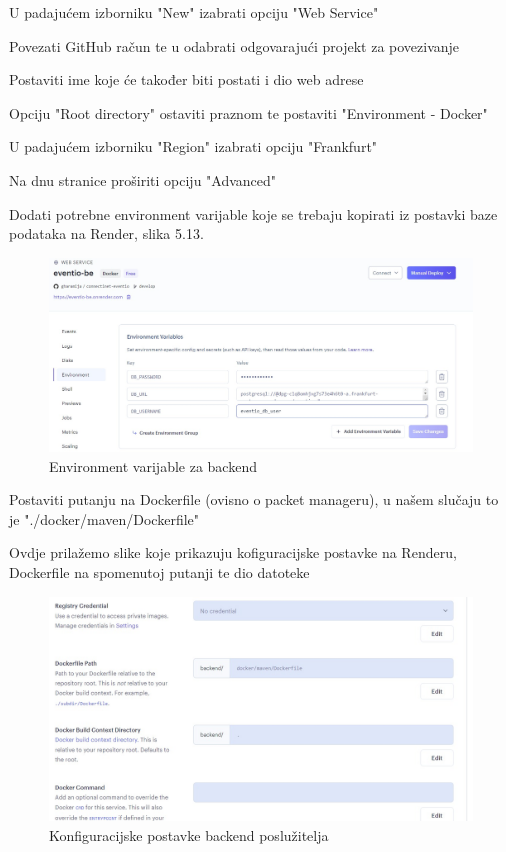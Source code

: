 			\begin{packed_enum}
				
				\item  U padajućem izborniku "New" izabrati opciju "Web Service"
				\item	Povezati GitHub račun te u odabrati odgovarajući projekt za povezivanje
				\item	Postaviti ime koje će također biti postati i dio web adrese
				\item	Opciju "Root directory" ostaviti praznom te postaviti "Environment - Docker"
				\item 	U padajućem izborniku "Region" izabrati opciju "Frankfurt"
				\item 	Na dnu stranice proširiti opciju "Advanced"
				\item 	Dodati potrebne environment varijable koje se trebaju kopirati iz postavki baze podataka na Render, slika 5.13.
				
				\begin{figure}[H]
					\includegraphics[scale=0.3]{deploy/backendEnv.jpeg}
					\centering
					\caption{Environment varijable za backend}
					\label{fig:promjene}
				\end{figure}
				
				\item 	Postaviti putanju na Dockerfile (ovisno o packet manageru), u našem slučaju to je "./docker/maven/Dockerfile"
				
				Ovdje prilažemo slike koje prikazuju kofiguracijske postavke na Renderu, Dockerfile na spomenutoj putanji te dio datoteke 
				
				\begin{figure}[H]
					\includegraphics[scale=0.4]{deploy/backendConf.jpeg}
					\centering
					\caption{Konfiguracijske postavke backend poslužitelja}
					\label{fig:promjene}
				\end{figure}
				

\end{packed_enum}
